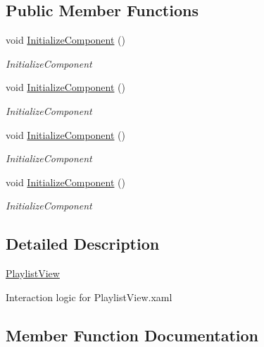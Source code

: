 \subsection*{Public Member Functions}
\begin{DoxyCompactItemize}
\item 
void \hyperlink{class_presentation_1_1_view_1_1_playlist_view_a025146640bbe45b42da5f72da40f3cc6}{Initialize\+Component} ()
\begin{DoxyCompactList}\small\item\em Initialize\+Component \end{DoxyCompactList}\item 
void \hyperlink{class_presentation_1_1_view_1_1_playlist_view_a025146640bbe45b42da5f72da40f3cc6}{Initialize\+Component} ()
\begin{DoxyCompactList}\small\item\em Initialize\+Component \end{DoxyCompactList}\item 
void \hyperlink{class_presentation_1_1_view_1_1_playlist_view_a025146640bbe45b42da5f72da40f3cc6}{Initialize\+Component} ()
\begin{DoxyCompactList}\small\item\em Initialize\+Component \end{DoxyCompactList}\item 
void \hyperlink{class_presentation_1_1_view_1_1_playlist_view_a025146640bbe45b42da5f72da40f3cc6}{Initialize\+Component} ()
\begin{DoxyCompactList}\small\item\em Initialize\+Component \end{DoxyCompactList}\end{DoxyCompactItemize}


\subsection{Detailed Description}
\hyperlink{class_presentation_1_1_view_1_1_playlist_view}{Playlist\+View} 

Interaction logic for Playlist\+View.\+xaml 

\subsection{Member Function Documentation}
\mbox{\label{class_presentation_1_1_view_1_1_playlist_view_a025146640bbe45b42da5f72da40f3cc6}} 
